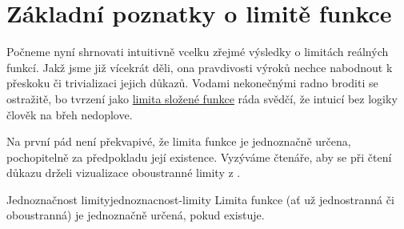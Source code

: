 \section{Základní poznatky o limitě funkce}
\label{sec:zakladni-poznatky-o-limite-funkce}

Počneme nyní shrnovati intuitivně vcelku zřejmé výsledky o limitách reálných
funkcí. Jakž jsme již vícekrát děli, ona  pravdivosti
výroků nechce nabodnout k přeskoku či trivializaci jejich důkazů. Vodami
nekonečnými radno broditi se ostražitě, bo tvrzení jako
\hyperref[thm:limita-slozene-funkce]{limita složené funkce} ráda svědčí, že
intuicí bez logiky člověk na břeh nedoplove.

Na první pád není překvapivé, že limita funkce je jednoznačně určena,
pochopitelně za předpokladu její existence. Vyzýváme čtenáře, aby se při čtení
důkazu drželi vizualizace oboustranné limity z
.

\begin{lemma}{Jednoznačnost limity}{jednoznacnost-limity}
	Limita funkce (ať už jednostranná či oboustranná) je jednoznačně určená, pokud
	existuje.
\end{lemma}

